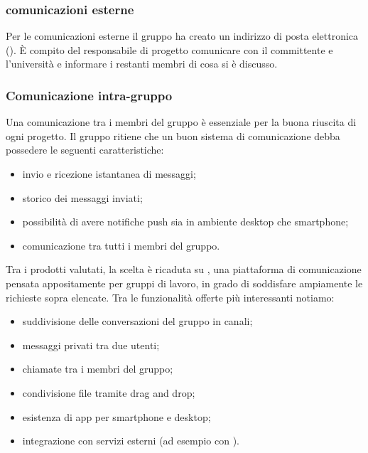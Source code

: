 		\subsubsection{comunicazioni esterne}
			Per le comunicazioni esterne il gruppo ha creato un indirizzo di posta elettronica (\email).
			È compito del responsabile di progetto comunicare con il committente e l'università e informare i restanti membri di cosa si è discusso. %

\subsubsection{Comunicazione intra-gruppo} 
Una comunicazione tra i membri del gruppo è essenziale per la buona riuscita di ogni progetto. Il gruppo ritiene che un buon sistema di comunicazione debba possedere le seguenti caratteristiche:
\begin{itemize}
	\item invio e ricezione istantanea di messaggi;
	\item storico dei messaggi inviati;
	\item possibilità di avere notifiche push sia in ambiente desktop che smartphone;
	\item comunicazione tra tutti i membri del gruppo.
\end{itemize}
Tra i prodotti valutati, la scelta è ricaduta su , una piattaforma di comunicazione pensata appositamente per gruppi di lavoro, in grado di soddisfare ampiamente le richieste sopra elencate. Tra le funzionalità offerte più interessanti notiamo:
\begin{itemize}
	\item suddivisione delle conversazioni del gruppo in canali;
	\item messaggi privati tra due utenti;
	\item chiamate tra i membri del gruppo; 
	\item condivisione file tramite drag and drop;
	\item esistenza di app per smartphone e desktop;
	\item integrazione con servizi esterni (ad esempio con ).
\end{itemize}
